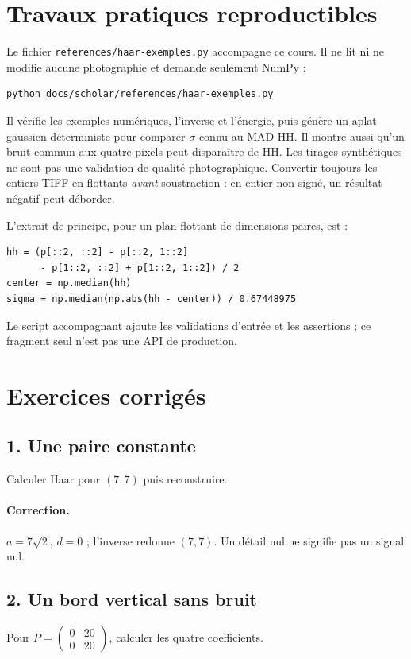 \section{Travaux pratiques reproductibles}
Le fichier \texttt{references/haar-exemples.py} accompagne ce cours.
Il ne lit ni ne modifie aucune photographie et demande seulement NumPy :
\begin{verbatim}
python docs/scholar/references/haar-exemples.py
\end{verbatim}
Il vérifie les exemples numériques, l'inverse et l'énergie, puis génère
un aplat gaussien déterministe pour comparer $\sigma$ connu au MAD HH.
Il montre aussi qu'un bruit commun aux quatre pixels peut disparaître de HH.
Les tirages synthétiques ne sont pas une validation de qualité photographique.
Convertir toujours les entiers TIFF en flottants \emph{avant} soustraction :
en entier non signé, un résultat négatif peut déborder.

L'extrait de principe, pour un plan flottant de dimensions paires, est :
\begin{verbatim}
hh = (p[::2, ::2] - p[::2, 1::2]
      - p[1::2, ::2] + p[1::2, 1::2]) / 2
center = np.median(hh)
sigma = np.median(np.abs(hh - center)) / 0.67448975
\end{verbatim}
Le script accompagnant ajoute les validations d'entrée et les assertions ;
ce fragment seul n'est pas une API de production.

\section{Exercices corrigés}
\subsection*{1. Une paire constante}
Calculer Haar pour $(7,7)$ puis reconstruire.
\paragraph{Correction.} $a=7\sqrt{2}$, $d=0$ ; l'inverse redonne $(7,7)$.
Un détail nul ne signifie pas un signal nul.

\subsection*{2. Un bord vertical sans bruit}
Pour $P=\begin{pmatrix}0&20\\0&20\end{pmatrix}$, calculer les quatre coefficients.
